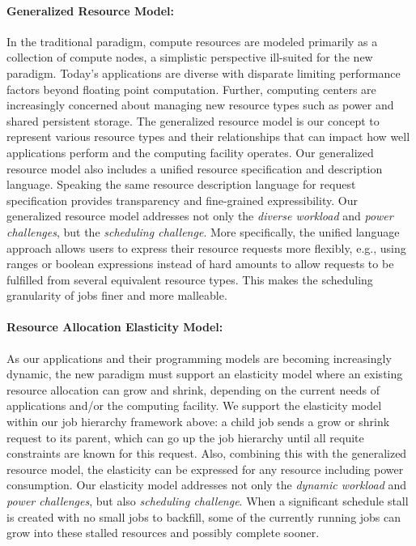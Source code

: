 \documentclass[10pt]{article}
\begin{document}
\paragraph{Generalized Resource Model:}
In the traditional paradigm, compute resources are modeled primarily as a collection of compute nodes,
a simplistic perspective ill-suited for the new paradigm. 
Today's applications are diverse with disparate limiting performance 
factors beyond floating point computation. Further, computing centers
are increasingly concerned about managing new resource types such as power
and shared persistent storage. The generalized resource model is our concept
to represent various resource types and their relationships 
that can impact how well applications perform and the computing
facility operates. Our generalized resource model also includes a
unified resource specification and description language. Speaking the
same resource description language for request specification 
provides transparency and fine-grained expressibility.
Our generalized resource model addresses not only the {\sl diverse workload}
and {\sl power challenges}, but the {\sl scheduling challenge}. More specifically, 
the unified language approach allows users to express their resource requests
more flexibly, e.g., using ranges or boolean expressions instead of hard amounts to allow requests to be fulfilled from several equivalent resource types.
This makes the scheduling granularity of jobs finer and more malleable.

\paragraph{Resource Allocation Elasticity Model:}
As our applications and their programming models are becoming increasingly
dynamic, the new paradigm must support an elasticity model where an existing
resource allocation can grow and shrink, depending on the current needs
of applications and/or the computing facility. We support the 
elasticity model within our job hierarchy framework above: a child job sends
a grow or shrink request to its parent, which can go up the job hierarchy
until all requite constraints are known for this request. Also, combining
this with the generalized resource model, the elasticity can be expressed for
any resource including power consumption. Our elasticity model addresses
not only the {\sl dynamic workload} and {\sl power challenges}, but also
{\sl scheduling challenge}. When a significant schedule stall is created 
with no small jobs to backfill, some of the currently running
jobs can grow into these stalled resources and possibly complete sooner.  
\end{document}
